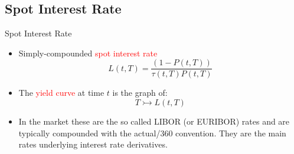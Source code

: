 \documentclass{beamer}
\begin{document}

\subsection{Spot Interest Rate}
\begin{frame}{Spot Interest Rate}
	\begin{itemize}
		\item Simply-compounded \textcolor{red}{spot interest rate}
		\begin{equation}
			L(t,T)=\frac{(1-P(t,T))}{\tau(t,T)P(t,T)}		
		\end{equation}
		\item The \textcolor{red}{yield curve} at time $t$ is the graph of:
		\begin{equation*}
			T\rightarrowtail L(t, T)
		\end{equation*}
		\item In the market these are the so called LIBOR (or EURIBOR) rates and are typically compounded with the actual/360 convention. They are the main rates underlying interest rate derivatives.
	\end{itemize}
\end{frame}
\end{document}
